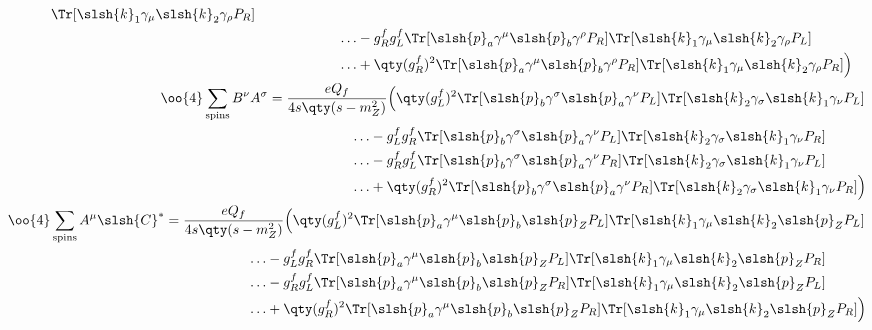 \begin{align}
\begin{split}
			\Tr[\slsh{k}_1\gamma_\mu \slsh{k}_2\gamma_\rho P_R]
			\\
			&\qquad\qquad\qquad\ldots
			-g_R^fg_L^f
			\Tr[\slsh{p}_a\gamma^\mu \slsh{p}_b\gamma^\rho P_R]
			\Tr[\slsh{k}_1\gamma_\mu \slsh{k}_2\gamma_\rho P_L]
			\\
			&\qquad\qquad\qquad\ldots
			+\qty(g_R^f)^2
			\Tr[\slsh{p}_a\gamma^\mu \slsh{p}_b\gamma^\rho P_R]
			\Tr[\slsh{k}_1\gamma_\mu \slsh{k}_2\gamma_\rho P_R]
			\Big)
	\end{split}
	\\
	\begin{split}
		\oo{4}\sum_\text{spins} B^\nu A^\sigma &=\frac{eQ_f}{4s\qty(s-m_Z^2)}
		\Big(
			\qty(g_L^f)^2
			\Tr[\slsh{p}_b\gamma^\sigma\slsh{p}_a\gamma^\nu P_L]
			\Tr[\slsh{k}_2\gamma_\sigma\slsh{k}_1\gamma_\nu P_L]
			\\
			&\qquad\qquad\qquad\ldots
			-g_L^fg_R^f
			\Tr[\slsh{p}_b\gamma^\sigma\slsh{p}_a\gamma^\nu P_L]
			\Tr[\slsh{k}_2\gamma_\sigma\slsh{k}_1\gamma_\nu P_R]
			\\
			&\qquad\qquad\qquad\ldots
			-g_R^fg_L^f
			\Tr[\slsh{p}_b\gamma^\sigma\slsh{p}_a\gamma^\nu P_R]
			\Tr[\slsh{k}_2\gamma_\sigma\slsh{k}_1\gamma_\nu P_L]
			\\
			&\qquad\qquad\qquad\ldots
			+\qty(g_R^f)^2
			\Tr[\slsh{p}_b\gamma^\sigma\slsh{p}_a\gamma^\nu P_R]
			\Tr[\slsh{k}_2\gamma_\sigma\slsh{k}_1\gamma_\nu P_R]
			\Big)
	\end{split}
	\\
	\begin{split}
		\oo{4}\sum_\text{spins}A^\mu \slsh{C}^*
		&=\frac{eQ_f}{4s\qty(s-m_Z^2)}
			\Big(
				\qty(g_L^f)^2
				\Tr[\slsh{p}_a\gamma^\mu \slsh{p}_b\slsh{p}_Z P_L]
				\Tr[\slsh{k}_1\gamma_\mu \slsh{k}_2\slsh{p}_Z P_L]
				\\
				&\qquad\qquad\qquad\ldots
				-g_L^fg_R^f
				\Tr[\slsh{p}_a\gamma^\mu \slsh{p}_b\slsh{p}_Z P_L]
				\Tr[\slsh{k}_1\gamma_\mu \slsh{k}_2\slsh{p}_Z P_R]
				\\
				&\qquad\qquad\qquad\ldots
				-g_R^fg_L^f
				\Tr[\slsh{p}_a\gamma^\mu \slsh{p}_b\slsh{p}_Z P_R]
				\Tr[\slsh{k}_1\gamma_\mu \slsh{k}_2\slsh{p}_Z P_L]
				\\
				&\qquad\qquad\qquad\ldots
				+\qty(g_R^f)^2
				\Tr[\slsh{p}_a\gamma^\mu \slsh{p}_b\slsh{p}_Z P_R]
				\Tr[\slsh{k}_1\gamma_\mu \slsh{k}_2\slsh{p}_Z P_R]
				\Big)
	\end{split}
\end{align}
